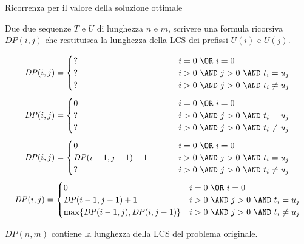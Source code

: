 \begin{frame}{Ricorrenza per il \alert{valore} della soluzione ottimale}

\vspace{-9pt}
Due due sequenze $T$ e $U$ di lunghezza $n$ e $m$, scrivere una formula
ricorsiva $\mathit{DP}(i, j)$ che restituisca la \alert{lunghezza} della LCS dei prefissi $U(i)$ e $U(j)$.

\begingroup
\small
\begin{overprint}
\[
  \mathit{DP}(i,j) = \begin{cases}
   \makebox[4cm][l]{?} & i=0\ \OR\ i=0 \\
   \makebox[4cm][l]{?} & i>0\ \AND\ j>0\ \AND\ t_i = u_j \\
   \makebox[4cm][l]{?} & i>0\ \AND\ j>0\ \AND\ t_i \neq u_j
  \end{cases}
\]
\[
  \mathit{DP}(i,j) = \begin{cases}
   0 & i=0\ \OR\ i=0 \\
   \makebox[4cm][l]{?} & i>0\ \AND\ j>0\ \AND\ t_i = u_j \\
   \makebox[4cm][l]{?} & i>0\ \AND\ j>0\ \AND\ t_i \neq u_j
  \end{cases}
\]
\[
  \mathit{DP}(i,j) = \begin{cases}
   0 & i=0\ \OR\ i=0 \\
   \mathit{DP}(i-1,j-1)+1 & i>0\ \AND\ j>0\ \AND\ t_i = u_j \\
   \makebox[4cm][l]{?} & i>0\ \AND\ j>0\ \AND\ t_i \neq u_j
  \end{cases}
\]
\[
  \mathit{DP}(i,j) = \begin{cases}
   0 & i=0\ \OR\ i=0 \\
   \mathit{DP}(i-1,j-1)+1 & i>0\ \AND\ j>0\ \AND\ t_i = u_j \\
   \max \{ \mathit{DP}(i-1,j), \mathit{DP}(i,j-1) \} & i>0\ \AND\ j>0\ \AND\ t_i \neq u_j
  \end{cases}
\]
\end{overprint}
\endgroup

\bigskip
{}

\smallskip
$\mathit{DP}(n,m)$ contiene la lunghezza della LCS del problema originale.

\end{frame}


